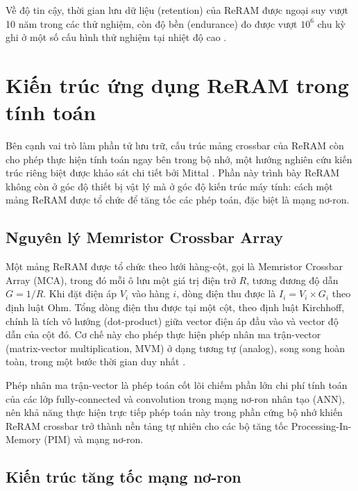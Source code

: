 \documentclass[12pt,a4paper]{article}
\begin{document}
Về độ tin cậy, thời gian lưu dữ liệu (retention) của ReRAM được ngoại suy vượt 10 năm trong các thử nghiệm, còn độ bền (endurance) đo được vượt $10^6$ chu kỳ ghi ở một số cấu hình thử nghiệm tại nhiệt độ cao \cite{meena2014}.


\section{Kiến trúc ứng dụng ReRAM trong tính toán}
\label{sec:reram-arch}

Bên cạnh vai trò làm phần tử lưu trữ, cấu trúc mảng crossbar của ReRAM còn cho phép thực hiện tính toán ngay bên trong bộ nhớ, một hướng nghiên cứu kiến trúc riêng biệt được khảo sát chi tiết bởi Mittal \cite{mittal2019}. Phần này trình bày ReRAM không còn ở góc độ thiết bị vật lý mà ở góc độ kiến trúc máy tính: cách một mảng ReRAM được tổ chức để tăng tốc các phép toán, đặc biệt là mạng nơ-ron.

\subsection{Nguyên lý Memristor Crossbar Array}

Một mảng ReRAM được tổ chức theo lưới hàng-cột, gọi là Memristor Crossbar Array (MCA), trong đó mỗi ô lưu một giá trị điện trở $R$, tương đương độ dẫn $G = 1/R$. Khi đặt điện áp $V_i$ vào hàng $i$, dòng điện thu được là $I_i = V_i \times G_i$ theo định luật Ohm. Tổng dòng điện thu được tại một cột, theo định luật Kirchhoff, chính là tích vô hướng (dot-product) giữa vector điện áp đầu vào và vector độ dẫn của cột đó. Cơ chế này cho phép thực hiện phép nhân ma trận-vector (matrix-vector multiplication, MVM) ở dạng tương tự (analog), song song hoàn toàn, trong một bước thời gian duy nhất \cite{mittal2019}.

Phép nhân ma trận-vector là phép toán cốt lõi chiếm phần lớn chi phí tính toán của các lớp fully-connected và convolution trong mạng nơ-ron nhân tạo (ANN), nên khả năng thực hiện trực tiếp phép toán này trong phần cứng bộ nhớ khiến ReRAM crossbar trở thành nền tảng tự nhiên cho các bộ tăng tốc Processing-In-Memory (PIM) và mạng nơ-ron.

\subsection{Kiến trúc tăng tốc mạng nơ-ron}
\end{document}
